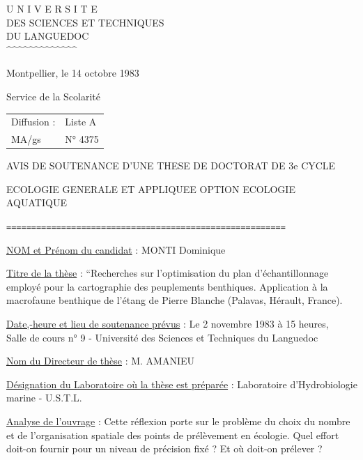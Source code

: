 
\noindent
\begin{minipage}[t]{.46\textwidth}
\begin{center}
U N I V E R S I T E\\
DES SCIENCES ET TECHNIQUES\\
DU LANGUEDOC\\
\textasciicircum\textasciicircum\textasciicircum\textasciicircum\textasciicircum\textasciicircum\textasciicircum\textasciicircum\textasciicircum\textasciicircum\textasciicircum\textasciicircum\textasciicircum
\end{center}
\end{minipage}\hfill
\begin{minipage}[t]{.50\textwidth}
\vspace{.9\baselineskip}
Montpellier, le 14 octobre 1983
\end{minipage}

Service de la Scolarité

\begin{tabular}{@{}ll@{}}
Diffusion : & Liste A\\
MA/gs & N° 4375
\end{tabular}

\begin{center}
AVIS DE SOUTENANCE D'UNE THESE DE DOCTORAT DE 3e CYCLE

ECOLOGIE GENERALE ET APPLIQUEE OPTION ECOLOGIE AQUATIQUE

\texttt{========================================================}
\end{center}

\uline{NOM et Prénom du candidat} : MONTI Dominique

\uline{Titre de la thèse} : ``Recherches sur l'optimisation du plan d'échantillonnage employé pour la cartographie des peuplements benthiques. Application à la macrofaune benthique de l'étang de Pierre Blanche (Palavas, Hérault, France).

\uline{Date,-heure et lieu de soutenance prévus} : Le 2 novembre 1983 à 15 heures,\\
Salle de cours n° 9 - Université des Sciences et Techniques du Languedoc

\uline{Nom du Directeur de thèse} : M. AMANIEU

\uline{Désignation du Laboratoire où la thèse est préparée} : Laboratoire d'Hydrobiologie marine - U.S.T.L.

\uline{Analyse de l'ouvrage} : Cette réflexion porte sur le problème du choix du nombre et de l'organisation spatiale des points de prélèvement en écologie. Quel effort doit-on fournir pour un niveau de précision fixé ? Et où doit-on prélever ?

